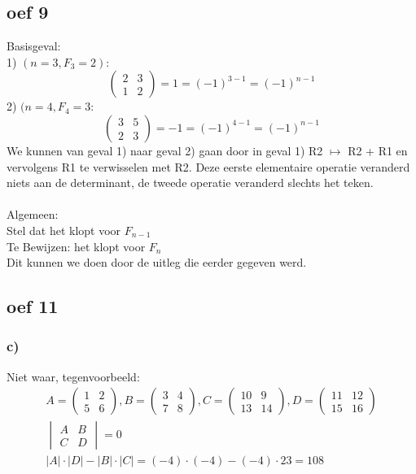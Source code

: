 \documentclass[10pt,a4paper]{article}
\begin{document}
\subsection*{oef 9}
Basisgeval: \\
1) $(n=3, F_{3}=2):$
\[ 
\begin{pmatrix}
2 & 3\\ 
1 & 2
\end{pmatrix}
= 1 = (-1)^{3-1} = (-1)^{n-1}
\]
2) $(n=4, F_{4}=3:$
\[
\begin{pmatrix}
3 & 5\\ 
2 & 3
\end{pmatrix}
= -1 = (-1)^{4-1} = (-1)^{n-1}
\]
We kunnen van geval 1) naar geval 2) gaan door in geval 1) R2 $\longmapsto $ R2 + R1 en vervolgens R1 te verwisselen met R2. Deze eerste elementaire operatie veranderd niets aan de determinant, de tweede operatie veranderd slechts het teken. \\
\\
Algemeen:\\
Stel dat het klopt voor $F_{n-1}$\\
Te Bewijzen: het klopt voor $F_{n}$\\
Dit kunnen we doen door de uitleg die eerder gegeven werd.

\subsection*{oef 11}
\subsubsection*{c)}
Niet waar, tegenvoorbeeld:
\begin{gather*}
    A = 
    \begin{pmatrix}
        1 & 2\\
        5 & 6
    \end{pmatrix} 
    , B = 
    \begin{pmatrix}
        3 & 4\\
        7 & 8
    \end{pmatrix}
    , C = 
    \begin{pmatrix}
        10 & 9\\
        13 & 14
    \end{pmatrix}
    , D = 
    \begin{pmatrix}
        11 & 12\\
        15 & 16
    \end{pmatrix}\\
    \begin{vmatrix}
        A & B\\
        C & D
    \end{vmatrix}
    = 0\\
    |A| \cdot |D| - |B| \cdot |C| = (-4) \cdot (-4) - (-4) \cdot 23 = 108
\end{gather*}
\end{document}
